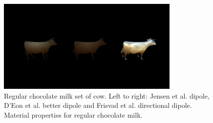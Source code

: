 \documentclass[12pt, twoside,a4paper, landscape]{article}
\begin{document}
\begin{figure}[here]
\centering
\includegraphics[width=0.8\textwidth]{cowmilk}
\caption{Regular chocolate milk set of cow. Left to right: Jensen et al. dipole, D'Eon et al. better dipole and Frisvad et al. directional dipole. Material properties for regular chocolate milk.}
\end{figure}
\end{document}
